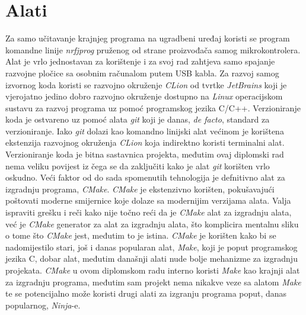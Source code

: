 \section{Alati}
Za samo učitavanje krajnjeg programa na ugradbeni uređaj koristi se program komandne linije \textit{nrfjprog} pruženog od strane proizvođača samog mikrokontrolera. Alat je vrlo jednostavan za korištenje i za svoj rad zahtjeva samo spajanje razvojne pločice sa osobnim računalom putem USB kabla. Za razvoj samog izvornog koda koristi se razvojno okruženje \textit{CLion} od tvrtke \textit{JetBrains} koji je vjerojatno jedino dobro razvojno okruženje dostupno na \textit{Linux} operacijskom sustavu za razvoj programa uz pomoć programskog jezika C/C++. Verzioniranje koda je ostvareno uz pomoć alata \textit{git} koji je danas, \textit{de facto}, standard za verzioniranje. Iako \textit{git} dolazi kao komandno linijski alat većinom je korištena ekstenzija razvojnog okruženja \textit{CLion} koja indirektno koristi terminalni alat. Verzioniranje koda je bitna sastavnica projekta, međutim ovaj diplomski rad nema veliku povijest iz čega se da zaključiti kako je alat \textit{git} korišten vrlo oskudno. Veći faktor od do sada spomenutih tehnologija je defnitivno alat za izgradnju programa, \textit{CMake}. \textit{CMake} je ekstenzivno korišten, pokušavajući poštovati moderne smijernice koje dolaze sa modernijim verzijama alata. Valja ispraviti grešku i reči kako nije točno reći da je \textit{CMake} alat za izgradnju alata, već je \textit{CMake} generator za alat za izgradnju alata, što komplicira mentalnu sliku o tome što \textit{CMake} jest, međutim to je istina. \textit{CMake} je korišten kako bi se nadomijestilo stari, još i danas popularan alat, \textit{Make}, koji je poput programskog jezika C, dobar alat, međutim današnji alati nude bolje mehanizme za izgradnju projekata. \textit{CMake} u ovom diplomskom radu interno koristi \textit{Make} kao krajnji alat za izgradnju programa, međutim sam projekt nema nikakve veze sa alatom \textit{Make} te se potencijalno može koristi drugi alati za izgranju programa poput, danas popularnog, \textit{Ninja}-e.\\
